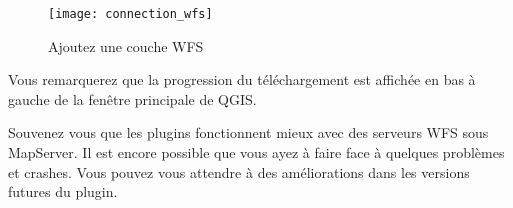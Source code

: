 \begin{figure}[ht]
  \begin{center}
 \caption{Ajoutez une couche WFS\nixcaption}\label{fig:wfs_dmsolutions}
 \texttt{[image: connection\_wfs]}
  \end{center}
\end{figure}
Vous remarquerez que la progression du t\'el\'echargement est affich\'ee en bas \`a
gauche de la fen\^etre principale de QGIS.

Souvenez vous que les plugins fonctionnent mieux avec des serveurs WFS sous
MapServer. Il est encore possible que vous ayez \`a faire face \`a quelques
probl\`emes et crashes. Vous pouvez vous attendre \`a des am\'eliorations dans les
versions futures du plugin.

\begin{Astuce}[ht]\caption{\textsc{Trouver des serveurs WMS et WFS}}
\end{Astuce}